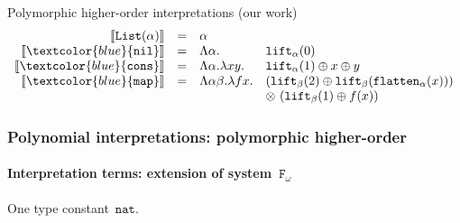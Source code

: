 \documentclass[10pt,presentation,color=names]{beamer}
\newcommand{\Fomega}{\mathtt{F}_\omega}
\newcommand{\nat}{\mathtt{nat}}
\newcommand{\flatten}{\mathtt{flatten}}
\newcommand{\lift}{\mathtt{lift}}
\newcommand{\typeinterpret}[1]{\llbracket #1 \rrbracket}
\newcommand{\interpret}[1]{\llbracket #1 \rrbracket}
\newcommand{\symb}[1]{\textcolor{blue}{\mathtt{#1}}}
\newcommand{\List}{\mathtt{List}}
\newcommand{\nil}{\symb{nil}}
\newcommand{\cons}{\symb{cons}}
\newcommand{\map}{\symb{map}}
\begin{document}
\begin{frame}{Polymorphic higher-order interpretations (our work)}
\[
\begin{array}{rcll}
\typeinterpret{\List(\alpha)} & = & \alpha \\
\interpret{\nil} & = & \Lambda \alpha. & \lift_\alpha(0) \\
\interpret{\cons} & = & \Lambda \alpha.\lambda xy. & \lift_\alpha(1) \oplus x \oplus y \\
\interpret{\map} & = & \Lambda \alpha\beta.\lambda f x. & (\lift_\beta(2) \oplus \lift_\beta(\flatten_\alpha(x))) \\
  & & & \otimes\ (\lift_\beta(1) \oplus f(x)) \\
\end{array}
\]
\end{frame}

\begin{frame} %
  \frametitle{Polynomial interpretations: polymorphic higher-order}
  \framesubtitle{Interpretation terms: extension of system~$\Fomega$}
  One type constant~$\nat$.\pause

  \medskip


\end{frame}
\end{document}
